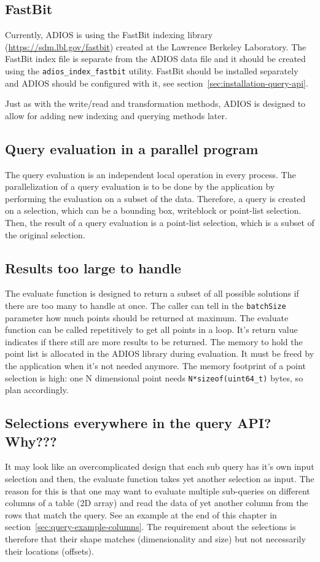 \subsection{FastBit}
Currently, ADIOS is using the FastBit indexing library (\url{https://sdm.lbl.gov/fastbit}) created at the Lawrence Berkeley Laboratory. The FastBit index file is separate from the ADIOS data file and it should be created using the \verb+adios_index_fastbit+ utility. FastBit should be installed separately and ADIOS should be configured with it, see section~\ref{sec:installation-query-api}. 

Just as with the write/read and transformation methods, ADIOS is designed to allow for adding new indexing and querying methods later. 

\subsection{Query evaluation in a parallel program}
The query evaluation is an independent local operation in every process. The parallelization of a query evaluation is to be done by the application by performing the evaluation on a subset of the data. Therefore, a query is created on a selection, which can be a bounding box, writeblock or point-list selection. Then, the result of a query evaluation is a point-list selection, which is a subset of the original selection.  

\subsection{Results too large to handle}
The evaluate function is designed to return a subset of all possible solutions if there are too many to handle at once. The caller can tell in the \verb+batchSize+ parameter how much points should be returned at maximum. The evaluate function can be called repetitively to get all points in a loop. It's return value indicates if there still are more results to be returned. The memory to hold the point list is allocated in the ADIOS library during evaluation. It must be freed by the application when it's not needed anymore. The memory footprint of a point selection is high: one N dimensional point needs \verb+N*sizeof(uint64_t)+ bytes, so plan accordingly. 

\subsection{Selections everywhere in the query API? Why???}
It may look like an overcomplicated design that each sub query has it's own input selection and then, the evaluate function takes yet another selection as input. The reason for this is that one may want to evaluate multiple sub-queries on different columns of a table (2D array) and read the data of yet another column from the rows that match the query. See an example at the end of this chapter in section~\ref{sec:query-example-columns}. The requirement about the selections is therefore that their shape matches (dimensionality and size) but not necessarily their locations (offsets).

